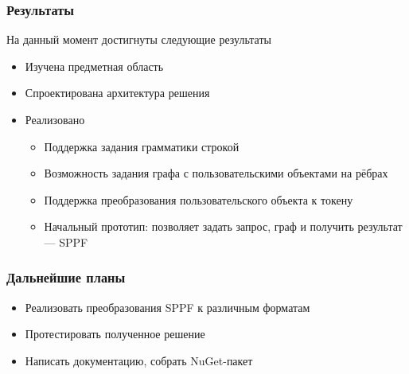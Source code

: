 \documentclass{beamer}
\begin{document}
\begin{frame}
  \transwipe[direction=90]
  \frametitle{Результаты}
  На данный момент достигнуты следующие результаты
  \begin{itemize}
    \item Изучена предметная область
    \item Спроектирована архитектура решения
    \item Реализовано
    \begin{itemize}
        \item Поддержка задания грамматики строкой
        \item Возможность задания графа с пользовательскими объектами на рёбрах
        \item Поддержка преобразования пользовательского объекта к токену
        \item Начальный прототип: позволяет задать запрос, граф и получить результат --- SPPF
    \end{itemize}
  \end{itemize}
\end{frame}



\begin{frame}
  \transwipe[direction=90]
  \frametitle{Дальнейшие планы}
  \begin{itemize}
    \item Реализовать преобразования SPPF к различным форматам
    \item Протестировать полученное решение
    \item Написать документацию, собрать NuGet-пакет
  \end{itemize}
\end{frame}
\end{document}
